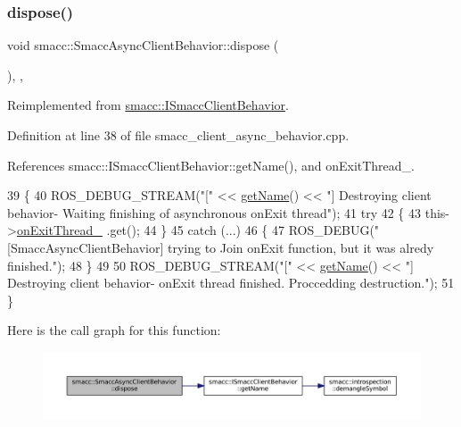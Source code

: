 \subsubsection{\texorpdfstring{dispose()}{dispose()}}
{\footnotesize\ttfamily void smacc\+::\+Smacc\+Async\+Client\+Behavior\+::dispose (\begin{DoxyParamCaption}{ }\end{DoxyParamCaption})\hspace{0.3cm}{\ttfamily [override]}, {\ttfamily [protected]}, {\ttfamily [virtual]}}



Reimplemented from \hyperlink{classsmacc_1_1ISmaccClientBehavior_abdc74a8d95fdd02794c19dfa90f8a6ce}{smacc\+::\+I\+Smacc\+Client\+Behavior}.



Definition at line 38 of file smacc\+\_\+client\+\_\+async\+\_\+behavior.\+cpp.



References smacc\+::\+I\+Smacc\+Client\+Behavior\+::get\+Name(), and on\+Exit\+Thread\+\_\+.


\begin{DoxyCode}
39     \{
40         ROS\_DEBUG\_STREAM(\textcolor{stringliteral}{"["} << \hyperlink{classsmacc_1_1ISmaccClientBehavior_a18e4bec9460b010f2894c0f7e7064a34}{getName}() << \textcolor{stringliteral}{"] Destroying client behavior- Waiting finishing of
       asynchronous onExit thread"});
41         \textcolor{keywordflow}{try}
42         \{
43             this->\hyperlink{classsmacc_1_1SmaccAsyncClientBehavior_af76d1c36b4a10425f2da043545b73299}{onExitThread\_} .get();
44         \}
45         \textcolor{keywordflow}{catch} (...)
46         \{
47             ROS\_DEBUG(\textcolor{stringliteral}{"[SmaccAsyncClientBehavior] trying to Join onExit function, but it was alredy
       finished."});
48         \}
49 
50         ROS\_DEBUG\_STREAM(\textcolor{stringliteral}{"["} << \hyperlink{classsmacc_1_1ISmaccClientBehavior_a18e4bec9460b010f2894c0f7e7064a34}{getName}() << \textcolor{stringliteral}{"] Destroying client behavior-  onExit thread finished.
       Proccedding destruction."});
51     \}
\end{DoxyCode}
Here is the call graph for this function\+:
\nopagebreak
\begin{figure}[H]
\begin{center}
\leavevmode
\includegraphics[width=350pt]{classsmacc_1_1SmaccAsyncClientBehavior_af475cee853947a8d3f513c7fb9789e7a_cgraph}
\end{center}
\end{figure}
\mbox{\label{classsmacc_1_1SmaccAsyncClientBehavior_ab8ca63d40d61554263466fe4c0b5cbd1}} 
